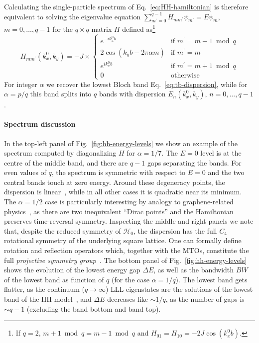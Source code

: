 % 
Calculating the single-particle spectrum of
Eq.~\eqref{eq:HH-hamiltonian} is therefore equivalent to solving the
eigenvalue equation
$\sum_{m^{\prime}=0}^{q-1} H_{mm^{\prime}}\psi_{m^{\prime}} =
E\psi_m$, $m=0,\dots,q-1$ for the $q \times q$ matrix $H$ defined
as\footnote{If $q = 2$, $m+1 \bmod q = m-1 \bmod q$ and
  $H_{01} = H_{10} = -2J\cos (k_x^0b)$.}
%
\begin{equation}\label{eq:Hmatrix}
  H_{mm^{\prime}}(k_x^0,k_y) = -J\times\begin{cases}
    e^{-ik_x^0 b} & \text{if $m^{\prime} = m-1 \bmod q$}\\
    2\cos\left(k_yb - 2\pi\alpha m\right) & \text{if $m^{\prime} = m$}\\
    e^{ik_x^0 b}  & \text{if $m^{\prime} = m+1 \bmod q$}\\
    0 & \text{otherwise}
  \end{cases}
\end{equation}
%
For integer $\alpha$ we recover the lowest Bloch band
Eq.~\eqref{eq:tb-dispersion}, while for $\alpha = p/q$ this band
splits into $q$ bands with dispersion $E_n(k_x^0,k_y)$, $n =
0,\dots,q-1$. 

\paragraph{Spectrum discussion}
In the top-left panel of Fig.~\ref{fig:hh-energy-levels} we show an
example of the spectrum computed by diagonalizing $H$ for
$\alpha = 1/7$. The $E=0$ level is at the centre of the middle band,
and there are $q-1$ gaps separating the bands. For even values of $q$,
the spectrum is symmetric with respect to $E=0$ and the two central
bands touch at zero energy. Around these degeneracy points, the
dispersion is linear~\cite{PhysRevB.39.11943}, while in all other
cases it is quadratic near its minimum. The $\alpha=1/2$ case is
particularly interesting by analogy to graphene-related
physics~\cite{RevModPhys.81.109}, as there are two inequivalent
``Dirac points'' and the Hamiltonian preserves time-reversal
symmetry. Inspecting the middle and right panels we note that, despite
the reduced symmetry of $\mathcal{H}_0$, the dispersion has the full
$C_4$ rotational symmetry of the underlying square lattice. One can
formally define rotation and reflection operators which, together with
the MTOs, constitute the full \textit{projective symmetry
  group}~\cite{PhysRevB.65.165113}.  The bottom panel of
Fig.~\ref{fig:hh-energy-levels} shows the evolution of the lowest
energy gap $\Delta E$, as well as the bandwidth $BW$ of the lowest
band as function of $q$ (for the case $\alpha = 1/q$). The lowest band
gets flatter, as the continuum ($q \rightarrow \infty$) LLL
eigenstates are the solutions of the lowest band of the HH
model~\cite{bernevig2013topological}, and $\Delta E$ decreases like
$\sim 1/q$, as the number of gaps is $\sim q-1$ (excluding the band
bottom and band top).


